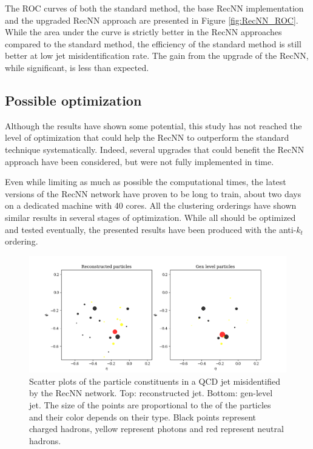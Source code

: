 The ROC curves of both the standard method, the base RecNN implementation and the upgraded RecNN approach are presented in Figure \ref{fig:RecNN_ROC}. While the area under the curve is strictly better in the RecNN approaches compared to the standard method, the efficiency of the standard method is still better at low jet misidentification rate. The gain from the upgrade of the RecNN, while significant, is less than expected. 


\subsection{Possible optimization}

Although the results have shown some potential, this study has not reached the level of optimization that could help the RecNN to outperform the standard technique systematically. Indeed, several upgrades that could benefit the RecNN approach have been considered, but were not fully implemented in time. 

Even while limiting as much as possible the computational times, the latest versions of the RecNN network have proven to be long to train, about two days on a dedicated machine with 40 cores. All the clustering orderings have shown similar results in several stages of optimization. While all should be optimized and tested eventually, the presented results have been produced with the anti-$k_t$ ordering.


\begin{figure}
    \centering
    \includegraphics[width=\textwidth]{Images/mistaggedQCD.png}
    \caption{Scatter plots of the particle constituents in a QCD jet misidentified by the RecNN network. Top: reconstructed jet. Bottom: gen-level jet. The size of the points are proportional to the \pt of the particles and their color depends on their type. Black points represent charged hadrons, yellow represent photons and red represent neutral hadrons.}
    \label{fig:jet_display}
\end{figure}


